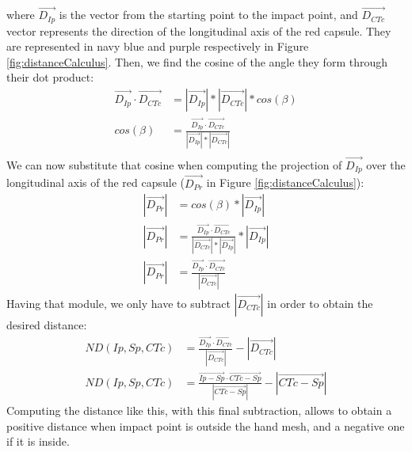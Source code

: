where $\overrightarrow{D_{Ip}}$ is the vector from the starting point to the impact point, and $\overrightarrow{D_{CTc}}$ vector represents the direction of the longitudinal axis of the red capsule. They are represented in navy blue and purple respectively in Figure \ref{fig:distanceCalculus}. Then, we find the cosine of the angle they form through their dot product:
\begin{equation} \label{eq:1aux2}
\begin{split}
\overrightarrow{D_{Ip}} \cdot \overrightarrow{D_{CTc}} &= |\overrightarrow{D_{Ip}}| * |\overrightarrow{D_{CTc}}| * cos(\beta)\\
cos(\beta) &= \frac{\overrightarrow{D_{Ip}} \cdot \overrightarrow{D_{CTc}}}{|\overrightarrow{D_{Ip}}| * |\overrightarrow{D_{CTc}}|}\\
\end{split}
\end{equation}
We can now substitute that cosine when computing the projection of $\overrightarrow{D_{Ip}}$ over the longitudinal axis of the red capsule ($\overrightarrow{D_{Pr}}$ in Figure \ref{fig:distanceCalculus}):
\begin{equation} \label{eq:1aux3}
\begin{split}
|\overrightarrow{D_{Pr}}| &= cos(\beta) * |\overrightarrow{D_{Ip}}|\\
|\overrightarrow{D_{Pr}}| &= \frac{\overrightarrow{D_{Ip}} \cdot \overrightarrow{D_{CTc}}}{|\overrightarrow{D_{CTc}}| * |\overrightarrow{D_{Ip}}|} * |\overrightarrow{D_{Ip}}|\\
|\overrightarrow{D_{Pr}}| &= \frac{\overrightarrow{D_{Ip}} \cdot \overrightarrow{D_{CTc}}}{|\overrightarrow{D_{CTc}}|}
\end{split}
\end{equation}
Having that module, we only have to subtract $|\overrightarrow{D_{CTc}}|$ in order to obtain the desired distance:  
\begin{equation} \label{eq:1}
\begin{split}
ND(Ip,Sp,CTc) &= \frac{\overrightarrow{D_{Ip}} \cdot \overrightarrow{D_{CTc}} }{|\overrightarrow{D_{CTc}}|} - |\overrightarrow{D_{CTc}}|\\
ND(Ip,Sp,CTc) &= \frac{\overrightarrow{Ip-Sp} \cdot \overrightarrow{CTc-Sp} }{|\overrightarrow{CTc-Sp}|} - |\overrightarrow{CTc-Sp}|
\end{split}
\end{equation}
Computing the distance like this, with this final subtraction, allows to obtain a positive distance when impact point is outside the hand mesh, and a negative one if it is inside.

